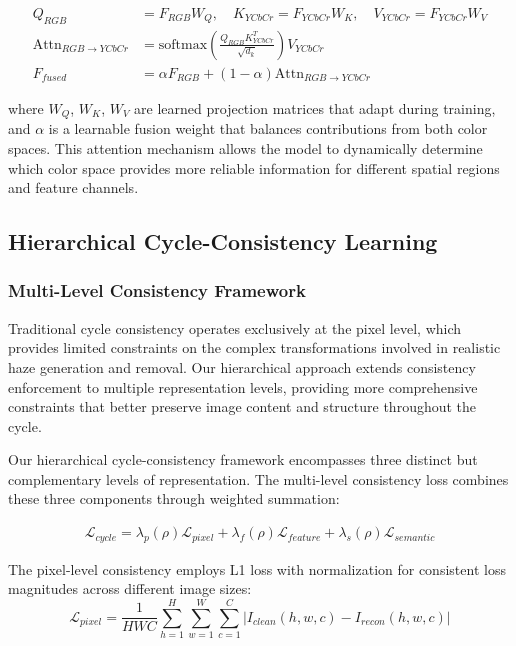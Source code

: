 \documentclass{article}
\begin{document}
\begin{align}
Q_{RGB} &= F_{RGB}W_Q, \quad K_{YCbCr} = F_{YCbCr}W_K, \quad V_{YCbCr} = F_{YCbCr}W_V \\
\text{Attn}_{RGB \rightarrow YCbCr} &= \text{softmax}\left(\frac{Q_{RGB}K_{YCbCr}^T}{\sqrt{d_k}}\right)V_{YCbCr} \\
F_{fused} &= \alpha F_{RGB} + (1-\alpha) \text{Attn}_{RGB \rightarrow YCbCr}
\end{align}

where $W_Q$, $W_K$, $W_V$ are learned projection matrices that adapt during training, and $\alpha$ is a learnable fusion weight that balances contributions from both color spaces. This attention mechanism allows the model to dynamically determine which color space provides more reliable information for different spatial regions and feature channels.

\subsection{Hierarchical Cycle-Consistency Learning}

\subsubsection{Multi-Level Consistency Framework}

Traditional cycle consistency operates exclusively at the pixel level, which provides limited constraints on the complex transformations involved in realistic haze generation and removal. Our hierarchical approach extends consistency enforcement to multiple representation levels, providing more comprehensive constraints that better preserve image content and structure throughout the cycle.

Our hierarchical cycle-consistency framework encompasses three distinct but complementary levels of representation. The multi-level consistency loss combines these three components through weighted summation:

\begin{align}
\mathcal{L}_{cycle} = \lambda_p(\rho) \mathcal{L}_{pixel} + \lambda_f(\rho) \mathcal{L}_{feature} + \lambda_s(\rho) \mathcal{L}_{semantic}
\end{align}

The pixel-level consistency employs L1 loss with normalization for consistent loss magnitudes across different image sizes:
\begin{equation}
\mathcal{L}_{pixel} = \frac{1}{HWC} \sum_{h=1}^{H} \sum_{w=1}^{W} \sum_{c=1}^{C} |I_{clean}(h,w,c) - I_{recon}(h,w,c)|
\end{equation}
\end{document}
